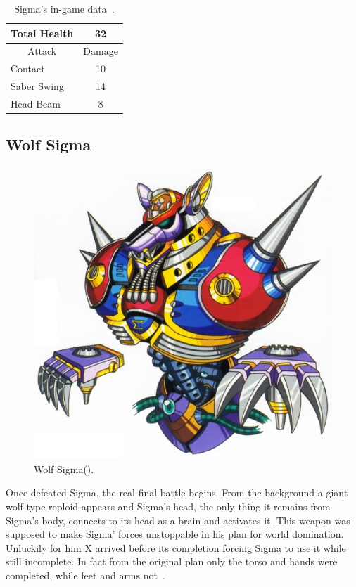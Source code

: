 \begin{table}
	\centering
	\begin{tabular}[h]{l c}
		\toprule
		Total Health  & 32\\
		\midrule
		\multicolumn{1}{c}{Attack} & \multicolumn{1}{c}{Damage}\\
		Contact & 10\\
		Saber Swing & 14\\
		Head Beam& 8\\
		\bottomrule
	\end{tabular}
	\caption{Sigma's in-game data~\cite{wiki:Sigma}.}
\end{table}

\subsection{Wolf Sigma}\label{boss:wolf_sigma}
\begin{figure}[htp]
	\centering
	\includegraphics[width=0.4\linewidth]{figures/X1/Sigma_stages/WolfSigma.jpg}
	\caption{Wolf Sigma(\cite{book:MMX_Complete_art}).}
\end{figure}
Once defeated Sigma, the real final battle begins. From the background a giant wolf-type reploid appears and Sigma's head, the only thing it remains from Sigma's body, connects to its head as a brain and activates it. This weapon was supposed to make Sigma' forces unstoppable in his plan for world domination. Unluckily for him X arrived before its completion forcing Sigma to use it while still incomplete. In fact from the original plan only the torso and hands were completed, while feet and arms not~\cite{wayback:X_resources}.


